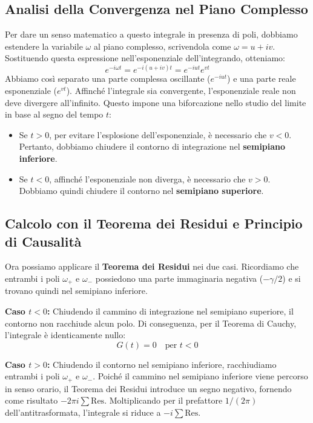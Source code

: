 \subsection{Analisi della Convergenza nel Piano Complesso}
Per dare un senso matematico a questo integrale in presenza di poli, dobbiamo estendere la variabile $\omega$ al piano complesso, scrivendola come $\omega = u + iv$.
Sostituendo questa espressione nell'esponenziale dell'integrando, otteniamo:
\begin{equation}
e^{-i\omega t} = e^{-i(u+iv)t} = e^{-iut} e^{vt}
\end{equation}
Abbiamo così separato una parte complessa oscillante ($e^{-iut}$) e una parte reale esponenziale ($e^{vt}$). Affinché l'integrale sia convergente, l'esponenziale reale non deve divergere all'infinito. Questo impone una biforcazione nello studio del limite in base al segno del tempo $t$:
\begin{itemize}
\item Se $t > 0$, per evitare l'esplosione dell'esponenziale, è necessario che $v < 0$. Pertanto, dobbiamo chiudere il contorno di integrazione nel \textbf{semipiano inferiore}.
\item Se $t < 0$, affinché l'esponenziale non diverga, è necessario che $v > 0$. Dobbiamo quindi chiudere il contorno nel \textbf{semipiano superiore}.
\end{itemize}

\subsection{Calcolo con il Teorema dei Residui e Principio di Causalità}
Ora possiamo applicare il \textbf{Teorema dei Residui} nei due casi. Ricordiamo che entrambi i poli $\omega_+$ e $\omega_-$ possiedono una parte immaginaria negativa ($-\gamma/2$) e si trovano quindi nel semipiano inferiore.

\textbf{Caso $t < 0$:}
Chiudendo il cammino di integrazione nel semipiano superiore, il contorno non racchiude alcun polo. Di conseguenza, per il Teorema di Cauchy, l'integrale è identicamente nullo:
\begin{equation}
G(t) = 0 \quad \text{per } t < 0
\end{equation}

\textbf{Caso $t > 0$:}
Chiudendo il contorno nel semipiano inferiore, racchiudiamo entrambi i poli $\omega_+$ e $\omega_-$. Poiché il cammino nel semipiano inferiore viene percorso in senso orario, il Teorema dei Residui introduce un segno negativo, fornendo come risultato $-2\pi i \sum \text{Res}$. Moltiplicando per il prefattore $1/(2\pi)$ dell'antitrasformata, l'integrale si riduce a $-i \sum \text{Res}$.

